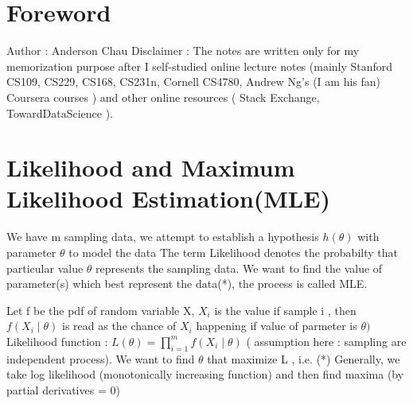 \documentclass{article}
\begin{document}
\section{Foreword}
Author : Anderson Chau
\newline 
\newline 
Disclaimer : The notes are written only for my memorization purpose after I self-studied online lecture notes (mainly Stanford CS109, CS229, CS168, CS231n, Cornell CS4780, Andrew Ng's (I am his fan) Coursera courses ) and other online resources ( Stack Exchange, TowardDataScience ).
\section{Likelihood and Maximum Likelihood Estimation(MLE)}
We have m sampling data, we attempt to establish a hypothesis \(h(\theta)\) with parameter \(\theta\) to model the data \newline
The term Likelihood denotes the probabilty that particular value \(\theta\) represents the sampling data.\newline 
We want to find the value of parameter(s) which best represent the data(*), the process is called MLE. \newline 

Let f be the pdf of random variable X, \(X_i\) is the value if sample i ,  then \(f(X_i \mid \theta)\) is read as the chance of \(X_i\) happening if value of parmeter is \(\theta)\) \newline  \newline 
Likelihood function : \(L(\theta) = \prod_{i=1}^{m} f(X_i \mid \theta)\) ( assumption here : sampling are independent process). We want to find \(\theta\) that maximize  L , i.e. (*) \newline
Generally, we take log likelihood (monotonically increasing function) and then find maxima (by partial derivatives = 0) 
\end{document}
